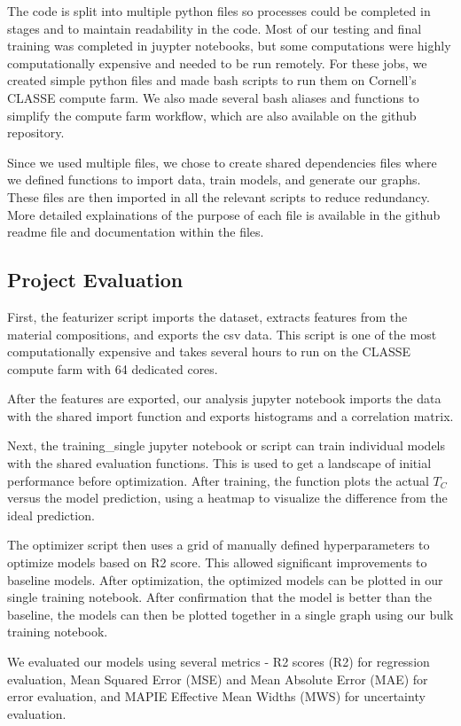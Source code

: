 \documentclass[twocolumn, nofootinbib, secnumarabic, amssymb, nobibnotes, aps, prd]{revtex4-2}
\begin{document}
The code is split into multiple python files so processes could be completed in stages and to maintain readability in the code. Most of our testing and final training was completed in juypter notebooks, but some computations were highly computationally expensive and needed to be run remotely. For these jobs, we created simple python files and made bash scripts to run them on Cornell's CLASSE compute farm. We also made several bash aliases and functions to simplify the compute farm workflow, which are also available on the github repository. 

Since we used multiple files, we chose to create shared dependencies files where we defined functions to import data, train models, and generate our graphs. These files are then imported in all the relevant scripts to reduce redundancy. More detailed explainations of the purpose of each file is available in the github readme file and documentation within the files.

\subsection{Project Evaluation}

First, the featurizer script imports the dataset, extracts features from the material compositions, and exports the csv data. This script is one of the most computationally expensive and takes several hours to run on the CLASSE compute farm with 64 dedicated cores.

After the features are exported, our analysis jupyter notebook imports the data with the shared import function and exports histograms and a correlation matrix. 

Next, the training\_single jupyter notebook or script can train individual models with the shared evaluation functions. This is used to get a landscape of initial performance before optimization. After training, the function plots the actual $T_C$ versus the model prediction, using a heatmap to visualize the difference from the ideal prediction.

The optimizer script then uses a grid of manually defined hyperparameters to optimize models based on R2 score. This allowed significant improvements to baseline models. After optimization, the optimized models can be plotted in our single training notebook. After confirmation that the model is better than the baseline, the models can then be plotted together in a single graph using our bulk training notebook. 

We evaluated our models using several metrics - R2 scores (R2) for regression evaluation, Mean Squared Error (MSE) and Mean Absolute Error (MAE) for error evaluation, and MAPIE Effective Mean Widths (MWS) for uncertainty evaluation.
\end{document}
